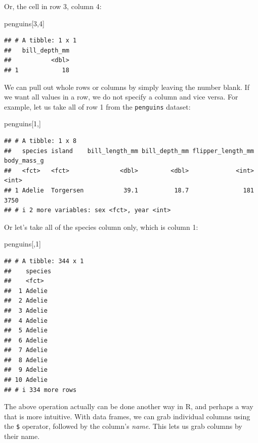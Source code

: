 \documentclass[
]{book}
\newenvironment{Shaded}{\begin{snugshade}}{\end{snugshade}}
\newcommand{\DecValTok}[1]{\textcolor[rgb]{0.00,0.00,0.81}{#1}}
\newcommand{\NormalTok}[1]{#1}
\begin{document}
Or, the cell in row 3, column 4:

\begin{Shaded}
\begin{Highlighting}[]
\NormalTok{penguins[}\DecValTok{3}\NormalTok{,}\DecValTok{4}\NormalTok{]}
\end{Highlighting}
\end{Shaded}

\begin{verbatim}
## # A tibble: 1 x 1
##   bill_depth_mm
##           <dbl>
## 1            18
\end{verbatim}

We can pull out whole rows or columns by simply leaving the number blank. If we want all values in a row, we do not specify a column and vice versa. For example, let us take all of row 1 from the \texttt{penguins} dataset:

\begin{Shaded}
\begin{Highlighting}[]
\NormalTok{penguins[}\DecValTok{1}\NormalTok{,]}
\end{Highlighting}
\end{Shaded}

\begin{verbatim}
## # A tibble: 1 x 8
##   species island    bill_length_mm bill_depth_mm flipper_length_mm body_mass_g
##   <fct>   <fct>              <dbl>         <dbl>             <int>       <int>
## 1 Adelie  Torgersen           39.1          18.7               181        3750
## # i 2 more variables: sex <fct>, year <int>
\end{verbatim}

Or let's take all of the species column only, which is column 1:

\begin{Shaded}
\begin{Highlighting}[]
\NormalTok{penguins[,}\DecValTok{1}\NormalTok{]}
\end{Highlighting}
\end{Shaded}

\begin{verbatim}
## # A tibble: 344 x 1
##    species
##    <fct>  
##  1 Adelie 
##  2 Adelie 
##  3 Adelie 
##  4 Adelie 
##  5 Adelie 
##  6 Adelie 
##  7 Adelie 
##  8 Adelie 
##  9 Adelie 
## 10 Adelie 
## # i 334 more rows
\end{verbatim}

The above operation actually can be done another way in R, and perhaps a way that is more intuitive. With data frames, we can grab individual columns using the \texttt{\$} operator, followed by the column's \emph{name}. This lets us grab columns by their name.
\end{document}

